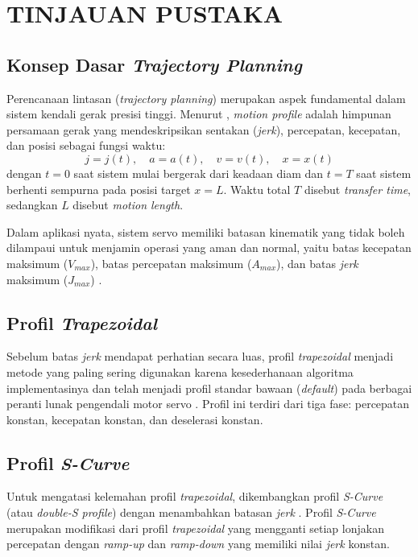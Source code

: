 \chapter{TINJAUAN PUSTAKA}
\label{bab:2}

\section{Konsep Dasar \textit{Trajectory Planning}}

Perencanaan lintasan (\textit{trajectory planning}) merupakan aspek fundamental dalam sistem kendali gerak presisi tinggi. Menurut \textcite{9310134}, \textit{motion profile} adalah himpunan persamaan gerak yang mendeskripsikan sentakan (\textit{jerk}), percepatan, kecepatan, dan posisi sebagai fungsi waktu:
\[
j = j(t), \quad a = a(t), \quad v = v(t), \quad x = x(t)
\]
dengan \( t = 0 \) saat sistem mulai bergerak dari keadaan diam dan \( t = T \) saat sistem berhenti sempurna pada posisi target \( x = L \). Waktu total \( T \) disebut \textit{transfer time}, sedangkan \( L \) disebut \textit{motion length}.

Dalam aplikasi nyata, sistem servo memiliki batasan kinematik yang tidak boleh dilampaui untuk menjamin operasi yang aman dan normal, yaitu batas kecepatan maksimum (\(V_{max}\)), batas percepatan maksimum (\(A_{max}\)), dan batas \textit{jerk} maksimum (\(J_{max}\)) \parencite{9310134}.

\section{Profil \textit{Trapezoidal}}

Sebelum batas \textit{jerk} mendapat perhatian secara luas, profil
\textit{trapezoidal} menjadi metode yang paling sering digunakan karena
kesederhanaan algoritma implementasinya \parencite{liu2026intelligent} dan telah
menjadi profil standar bawaan (\textit{default}) pada berbagai peranti lunak
pengendali motor servo \parencite{schnegas2024trajectory}. Profil ini terdiri
dari tiga fase: percepatan konstan, kecepatan konstan, dan deselerasi konstan.

\section{Profil \textit{S-Curve}}

Untuk mengatasi kelemahan profil \textit{trapezoidal}, dikembangkan profil
\textit{S-Curve} (atau \textit{double-S profile}) dengan menambahkan batasan
\textit{jerk} \parencite{9310134}. Profil \textit{S-Curve} merupakan modifikasi
dari profil \textit{trapezoidal} yang mengganti setiap lonjakan percepatan
dengan \textit{ramp-up} dan \textit{ramp-down} yang memiliki nilai \textit{jerk}
konstan.

